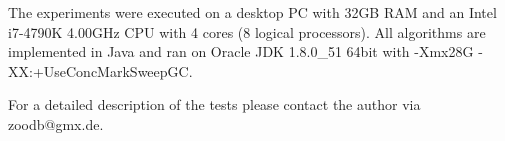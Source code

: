 \documentclass{vldb}
\begin{document}
The experiments were executed on a desktop PC with 32GB RAM and an Intel i7-4790K 4.00GHz
CPU with 4 cores (8 logical processors). All algorithms are implemented in Java and ran on Oracle
JDK 1.8.0\_51 64bit with -Xmx28G -XX:+UseConcMarkSweepGC.

For a detailed description of the tests please contact the author via zoodb@gmx.de. 




%
%
%
%
\end{document}
